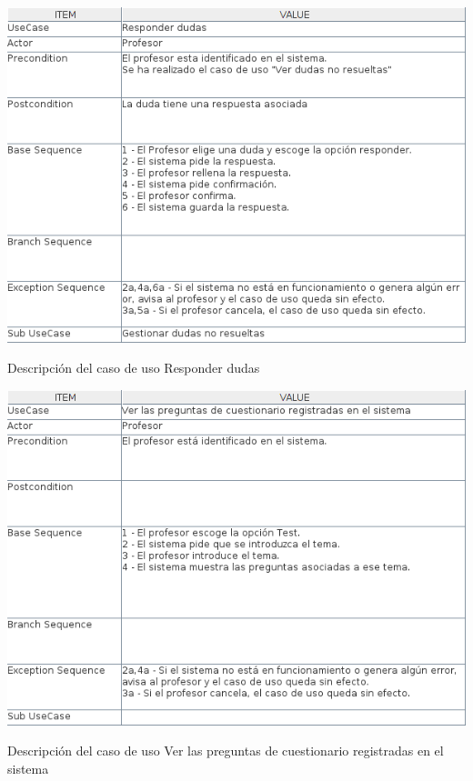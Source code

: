 \documentclass[openright,twoside,10pt]{book}
\begin{document}
    \vspace*{\fill}
    
    \newpage
    
    \vspace*{\fill}
    
    \begin{table}[H]
        \begin{center}
            \includegraphics[width=\textwidth]{img/astah/analisis/casos_de_uso/useCase11.png}
        \end{center}
        \caption{Descripción del caso de uso Responder dudas}
    \end{table}
    
    \vspace*{\fill}
    
    \newpage
    
    \vspace*{\fill}
    
    \begin{table}[H]
        \begin{center}
            \includegraphics[width=\textwidth]{img/astah/analisis/casos_de_uso/useCase12.png}
        \end{center}
        \caption{Descripción del caso de uso Ver las preguntas de cuestionario registradas en el sistema}
    \end{table}
    
\end{document}
